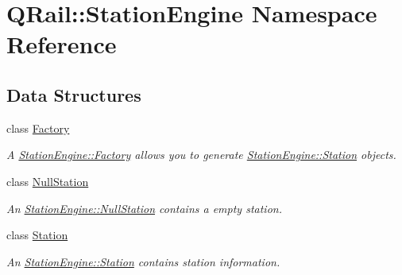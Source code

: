\hypertarget{namespaceQRail_1_1StationEngine}{}\section{Q\+Rail\+::Station\+Engine Namespace Reference}
\label{namespaceQRail_1_1StationEngine}
\subsection*{Data Structures}
\begin{DoxyCompactItemize}
\item 
class \mbox{\hyperlink{classQRail_1_1StationEngine_1_1Factory}{Factory}}
\begin{DoxyCompactList}\small\item\em A \mbox{\hyperlink{classQRail_1_1StationEngine_1_1Factory}{Station\+Engine\+::\+Factory}} allows you to generate \mbox{\hyperlink{classQRail_1_1StationEngine_1_1Station}{Station\+Engine\+::\+Station}} objects. \end{DoxyCompactList}\item 
class \mbox{\hyperlink{classQRail_1_1StationEngine_1_1NullStation}{Null\+Station}}
\begin{DoxyCompactList}\small\item\em An \mbox{\hyperlink{classQRail_1_1StationEngine_1_1NullStation}{Station\+Engine\+::\+Null\+Station}} contains a empty station. \end{DoxyCompactList}\item 
class \mbox{\hyperlink{classQRail_1_1StationEngine_1_1Station}{Station}}
\begin{DoxyCompactList}\small\item\em An \mbox{\hyperlink{classQRail_1_1StationEngine_1_1Station}{Station\+Engine\+::\+Station}} contains station information. \end{DoxyCompactList}\end{DoxyCompactItemize}
